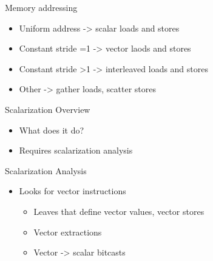 
\begin{frame}{Memory addressing}

\begin{itemize}
    \item Uniform address -> scalar loads and stores
    \item Constant stride =1 -> vector laods and stores
    \item Constant stride >1 -> interleaved loads and stores
    \item Other -> gather loads, scatter stores
\end{itemize}


\end{frame}



\begin{frame}{Scalarization Overview}

\begin{itemize}
    \item What does it do?
    \item Requires scalarization analysis
\end{itemize}

\end{frame}


\begin{frame}{Scalarization Analysis}

\begin{itemize}
    \item Looks for vector instructions
    \begin{itemize}
        \item Leaves that define vector values, vector stores
        \item Vector extractions
        \item Vector -> scalar bitcasts
    \end{itemize}
    
\end{itemize}

\end{frame}

